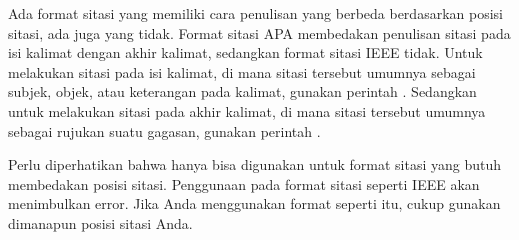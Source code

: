 Ada format sitasi yang memiliki cara penulisan yang berbeda berdasarkan posisi sitasi, ada juga yang tidak. Format sitasi APA membedakan penulisan sitasi pada isi kalimat dengan akhir kalimat, sedangkan format sitasi IEEE tidak. Untuk melakukan sitasi pada isi kalimat, di mana sitasi tersebut umumnya sebagai subjek, objek, atau keterangan pada kalimat, gunakan perintah . Sedangkan untuk melakukan sitasi pada akhir kalimat, di mana sitasi tersebut umumnya sebagai rujukan suatu gagasan, gunakan perintah .

Perlu diperhatikan bahwa  hanya bisa digunakan untuk format sitasi yang butuh membedakan posisi sitasi. Penggunaan  pada format sitasi seperti IEEE akan menimbulkan error. Jika Anda menggunakan format seperti itu, cukup gunakan  dimanapun posisi sitasi Anda.

